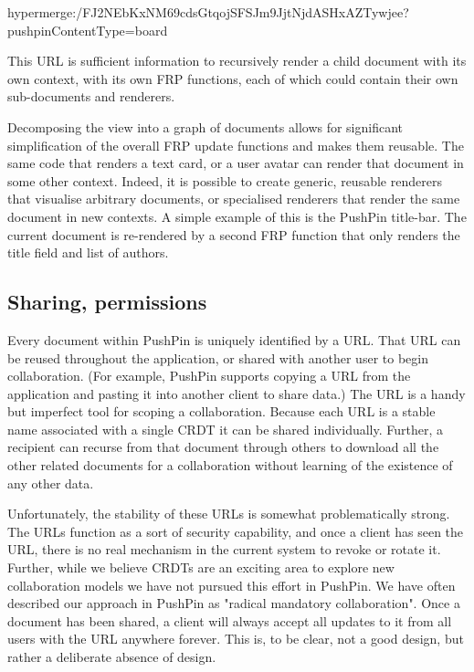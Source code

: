\documentclass[sigplan,10pt]{acmart}
\begin{document}
\begin{code}
hypermerge:/FJ2NEbKxNM69cdsGtqojSFSJm9JjtNjdASHxAZTywjee?pushpinContentType=board
\end{code}

This URL is sufficient information to recursively render a child document with its own context, with its own FRP functions, each of which could contain their own sub-documents and renderers.

Decomposing the view into a graph of documents allows for significant simplification of the overall FRP update functions and makes them reusable. The same code that renders a text card, or a user avatar can render that document in some other context. Indeed, it is possible to create generic, reusable renderers that visualise arbitrary documents, or specialised renderers that render the same document in new contexts. A simple example of this is the PushPin title-bar. The current document is re-rendered by a second FRP function that only renders the title field and list of authors. 


\subsection{Sharing, permissions}

Every document within PushPin is uniquely identified by a URL. That URL can be reused throughout the application, or shared with another user to begin collaboration. (For example, PushPin supports copying a URL from the application and pasting it into another client to share data.) The URL is a handy but imperfect tool for scoping a collaboration. Because each URL is a stable name associated with a single CRDT it can be shared individually. Further, a recipient can recurse from that document through others to download all the other related documents for a collaboration without learning of the existence of any other data. 

Unfortunately, the stability of these URLs is somewhat problematically strong. The URLs function as a sort of security capability, and once a client has seen the URL, there is no real mechanism in the current system to revoke or rotate it. Further, while we believe CRDTs are an exciting area to explore new collaboration models \cite{Pixelpusher} we have not pursued this effort in PushPin. We have often described our approach in PushPin as "radical mandatory collaboration". Once a document has been shared, a client will always accept all updates to it from all users with the URL anywhere forever. This is, to be clear, not a good design, but rather a deliberate absence of design. 
\end{document}

